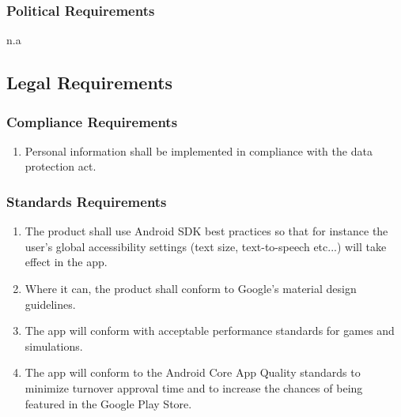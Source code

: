 \documentclass[]{article}
\begin{document}
\subsubsection{Political Requirements}
\label{ssub:political_requirements}
n.a


\subsection{Legal Requirements}
\label{sub:legal_requirements}

\subsubsection{Compliance Requirements}
\label{ssub:compliance_requirements}
\begin{enumerate}[{LR}1. ]
	\item Personal information shall be implemented in compliance with the data protection act.
	\holdEnum
\end{enumerate}

\subsubsection{Standards Requirements}
\label{ssub:standards_requirements}
\begin{enumerate}[{LR}1. ]
	\resumeEnum
	\item The product shall use Android SDK best practices so that for instance the user's global accessibility settings (text size, text-to-speech etc...) will take effect in the app. 
	\item Where it can, the product shall conform to Google's material design guidelines.
	\item The app will conform with acceptable performance standards for games and simulations.
	\item The app will conform to the Android Core App Quality standards to minimize turnover approval time and to increase the chances of being featured in the Google Play Store.
\end{enumerate}

\end{document}
